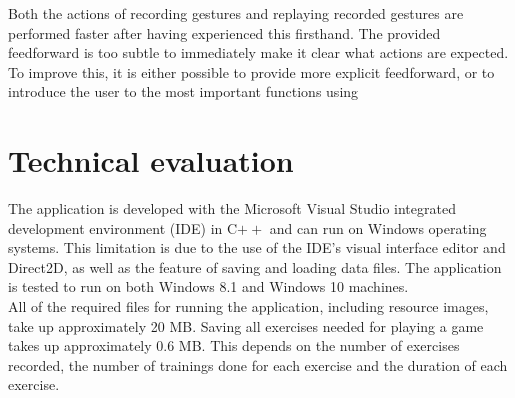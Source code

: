 Both the actions of recording gestures and replaying recorded gestures are performed faster after having experienced this firsthand. The provided feedforward is too subtle to immediately make it clear what actions are expected. To improve this, it is either possible to provide more explicit feedforward, or to introduce the user to the most important functions using


\section{Technical evaluation}

The application is developed with the Microsoft Visual Studio integrated development environment (IDE) in C$++$ and can run on Windows operating systems. This limitation is due to the use of the IDE's visual interface editor and Direct2D, as well as the feature of saving and loading data files. The application is tested to run on both Windows 8.1 and Windows 10 machines.\\

All of the required files for running the application, including resource images, take up approximately 20 MB. Saving all exercises needed for playing a game takes up approximately 0.6 MB. This depends on the number of exercises recorded, the number of trainings done for each exercise and the duration of each exercise.\\

